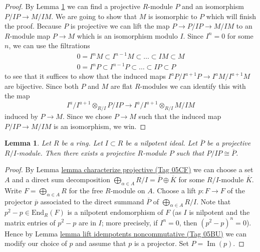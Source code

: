 \documentclass{amsart}
\theoremstyle{plain}
\newtheorem{lemma}[subsection]{Lemma}
\theoremstyle{definition}
\theoremstyle{remark}
\numberwithin{equation}{subsection}
\def\Im{\mathop{\mathrm{Im}}}
\begin{document}
\begin{proof}
By Lemma \ref{algebra-lemma-lift-projective-module} we can find a projective
$R$-module $P$ and an isomorphism $P/IP \to M/IM$. We are going to show
that $M$ is isomorphic to $P$ which will finish the proof. Because $P$
is projective we can lift the map $P \to P/IP \to M/IM$ to an $R$-module
map $P \to M$ which is an isomorphism modulo $I$. Since $I^n = 0$
for some $n$, we can use the filtrations
\begin{align*}
0 = I^nM \subset I^{n - 1}M \subset \ldots \subset IM \subset M \\
0 = I^nP \subset I^{n - 1}P \subset \ldots \subset IP \subset P
\end{align*}
to see that it suffices to show that the induced maps
$I^aP/I^{a + 1}P \to I^aM/I^{a + 1}M$ are bijective. Since both $P$
and $M$ are flat $R$-modules we can identify this with the map
$$
I^a/I^{a + 1} \otimes_{R/I} P/IP
\longrightarrow
I^a/I^{a + 1} \otimes_{R/I} M/IM
$$
induced by $P \to M$. Since we chose $P \to M$ such that the induced
map $P/IP \to M/IM$ is an isomorphism, we win.
\end{proof}


\begin{lemma}
\label{algebra-lemma-lift-projective-module}
Let $R$ be a ring. Let $I \subset R$ be a nilpotent ideal. Let
$\overline{P}$ be a projective $R/I$-module. Then there exists a
projective $R$-module $P$ such that $P/IP \cong \overline{P}$.
\end{lemma}

\begin{proof}
By Lemma \href{https://stacks.math.columbia.edu/tag/05CF}{lemma characterize projective (Tag 05CF)}
we can choose a set $A$ and a direct sum decomposition
$\bigoplus_{\alpha \in A} R/I = \overline{P} \oplus \overline{K}$
for some $R/I$-module $\overline{K}$. Write $F = \bigoplus_{\alpha \in A} R$
for the free $R$-module on $A$. Choose a lift
$p : F \to F$ of the projector $\overline{p}$ associated to
the direct summand $\overline{P}$ of $\bigoplus_{\alpha \in A} R/I$.
Note that $p^2 - p \in \text{End}_R(F)$ is a nilpotent
endomorphism of $F$ (as $I$ is nilpotent and the matrix entries of
$p^2 - p$ are in $I$; more precisely, if $I^n = 0$, then $(p^2 - p)^n = 0$).
Hence by Lemma \href{https://stacks.math.columbia.edu/tag/05BU}{lemma lift idempotents noncommutative (Tag 05BU)}
we can modify our choice of $p$ and assume that $p$ is a projector.
Set $P = \Im(p)$.
\end{proof}
\end{document}
